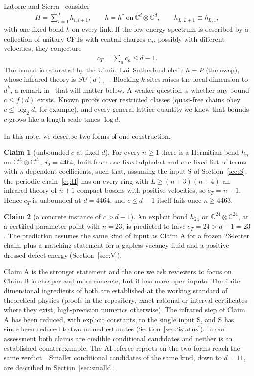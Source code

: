 \documentclass[11pt]{article}
\theoremstyle{definition}
\newtheorem{claim}{Claim}
\newcommand{\C}{\mathbb{C}}
\begin{document}
Latorre and Sierra~\cite{LS} consider
\begin{align}
H=\sum_{i=1}^{L} h_{i,i+1},\qquad h=h^\dagger \ \text{on}\ \C^d\otimes\C^d,\qquad h_{L,L+1}\equiv h_{L,1},
\label{eq:H}
\end{align}
with one fixed bond $h$ on every link. If the low-energy spectrum is described by a collection of unitary CFTs with central charges $c_a$, possibly with different velocities, they conjecture
\begin{align}
c_T=\sum_a c_a\le d-1 .
\label{eq:cd}
\end{align}
The bound is saturated by the Uimin--Lai--Sutherland chain $h=P$ (the swap), whose infrared theory is $SU(d)_1$~\cite{Sutherland}. Blocking $k$ sites raises the local dimension to $d^k$, a remark in~\cite{LS} that will matter below. A weaker question is whether any bound $c\le f(d)$ exists. Known proofs cover restricted classes (quasi-free chains obey $c\le\log_2 d$, for example), and every general lattice quantity we know that bounds $c$ grows like a length scale times $\log d$.

In this note, we describe two forms of one construction.

\begin{claim}[unbounded $c$ at fixed $d$]
For every $n\ge1$ there is a Hermitian bond $h_n$ on $\C^{d_0}\otimes\C^{d_0}$, $d_0=4464$, built from one fixed alphabet and one fixed list of terms with $n$-dependent coefficients, such that, assuming the input S of Section~\ref{sec:S}, the periodic chain~\eqref{eq:H} has on every ring with $L\ge(n+3)(n+4)$ an infrared theory of $n+1$ compact bosons with positive velocities, so $c_T=n+1$. Hence $c_T$ is unbounded at $d=4464$, and $c\le d-1$ itself fails once $n\ge 4463$.
\end{claim}

\begin{claim}[a concrete instance of $c>d-1$]
An explicit bond $h_{24}$ on $\C^{24}\otimes\C^{24}$, at a certified parameter point with $n=23$, is predicted to have $c_T=24>d-1=23$. The prediction assumes the same kind of input as Claim A for a frozen 23-letter chain, plus a matching statement for a gapless vacancy fluid and a positive dressed defect energy (Section~\ref{sec:V}).
\end{claim}

Claim A is the stronger statement and the one we ask reviewers to focus on. Claim B is cheaper and more concrete, but it has more open inputs. The finite-dimensional ingredients of both are established at the working standard of theoretical physics (proofs in the repository, exact rational or interval certificates where they exist, high-precision numerics otherwise). The infrared step of Claim A has been reduced, with explicit constants, to the single input S, and S has since been reduced to two named estimates (Section~\ref{sec:Sstatus}). In our assessment both claims are credible conditional candidates and neither is an established counterexample. The AI referee reports on the two forms reach the same verdict~\cite{refC44,refd24}. Smaller conditional candidates of the same kind, down to $d=11$, are described in Section~\ref{sec:smalld}.
\end{document}
